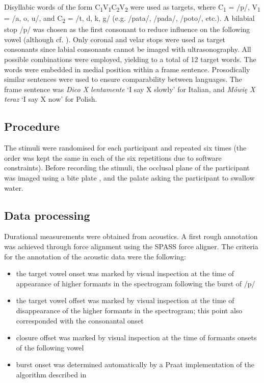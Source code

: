 \documentclass[]{elsarticle}
\providecommand{\tightlist}{%
  \setlength{\itemsep}{0pt}\setlength{\parskip}{0pt}}
\begin{document}
Disyllabic words of the form
C\textsubscript{1}V\textsubscript{1}C\textsubscript{2}V\textsubscript{2}
were used as targets, where C\textsubscript{1} = /p/, V\textsubscript{1}
= /a, o, u/, and C\textsubscript{2} = /t, d, k, g/ (e.g. /pata/, /pada/,
/poto/, etc.). A bilabial stop /p/ was chosen as the first consonant to
reduce influence on the following vowel (although cf.
\citet{vazquez-alvarez2007}). Only coronal and velar stops were used as
target consonants since labial consonants cannot be imaged with
ultrasonography. All possible combinations were employed, yielding to a
total of 12 target words. The words were embedded in medial position
within a frame sentence. Prosodically similar sentences were used to
ensure comparability between languages. The frame sentence was
\emph{Dico X lentamente} `I say X slowly' for Italian, and \emph{Mówię X
teraz} `I say X now' for Polish.

\subsection{Procedure}\label{procedure}

The stimuli were randomised for each participant and repeated six times
(the order was kept the same in each of the six repetitions due to
software constraints). Before recording the stimuli, the occlusal plane
of the participant was imaged using a bite plate \citep{scobbie2011},
and the palate asking the participant to swallow water.

\subsection{Data processing}\label{data-processing}

Durational measurements were obtained from acoustics. A first rough
annotation was achieved through force alignment using the SPASS force
aligner. The criteria for the annotation of the acoustic data were the
following:

\begin{itemize}
\tightlist
\item
  the target vowel onset was marked by visual inspection at the time of
  appearance of higher formants in the spectrogram following the burst
  of /p/
\item
  the target vowel offset was marked by visual inspection at the time of
  disappearance of the higher formants in the spectrogram; this point
  also corresponded with the consonantal onset
\item
  closure offset was marked by visual inspection at the time of formants
  onsets of the following vowel
\item
  burst onset was determined automatically by a Praat implementation of
  the algorithm described in \citet{ananthapadmanabha2014}
\end{itemize}
\end{document}
